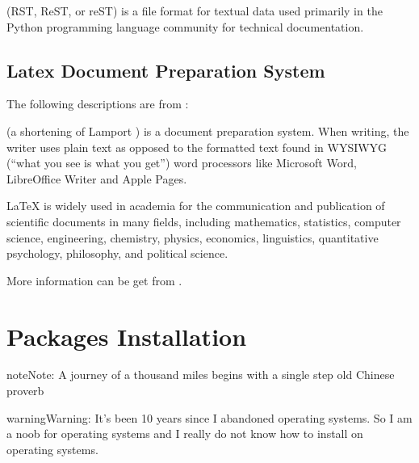 \documentclass[letterpaper,12pt,english]{sphinxmanual}
\begin{document}
 (RST, ReST, or reST) is a file format for textual data used primarily in the Python programming language community for technical documentation.


\section{Latex Document Preparation System}
\label{\detokenize{intro:latex-document-preparation-system}}
The following descriptions are from :

 (a shortening of Lamport ) is a document preparation system. When writing, the writer uses plain text as opposed to the formatted text found in WYSIWYG (“what you see is what you get”) word processors like Microsoft Word, LibreOffice Writer and Apple Pages.

LaTeX is widely used in academia for the communication and publication of scientific documents in many fields, including mathematics, statistics, computer science, engineering, chemistry, physics, economics, linguistics, quantitative psychology, philosophy, and political science.

More information can be get from  .


\chapter{Packages Installation}
\label{\detokenize{pkgs:packages-installation}}\label{\detokenize{pkgs:pkgs}}\label{\detokenize{pkgs::doc}}
\begin{sphinxadmonition}{note}{Note:}
A journey of a thousand miles begins with a single step \textendash{} old Chinese proverb
\end{sphinxadmonition}

\begin{sphinxadmonition}{warning}{Warning:}
It’s been 10 years since I abandoned  operating systems. So I am a noob for  operating systems and I really do not know how to install  on  operating systems.
\end{sphinxadmonition}
\end{document}
